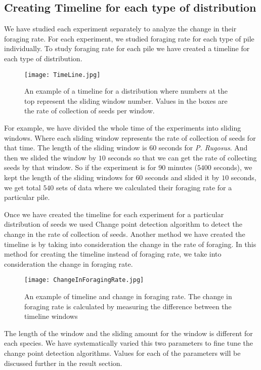  \subsection{\label{Creating Timeline for each type of distribution}Creating Timeline for each type of distribution}
 We have studied each experiment separately to analyze the change in their foraging rate. For each experiment, we studied foraging rate for each type of pile individually. To study foraging rate for each pile we have created a timeline for each type of distribution. \par
 \begin{figure}[h]
 	\texttt{[image: TimeLine.jpg]}
 	\caption{An example of a timeline for a distribution where numbers at the top represent the sliding window number. Values in the boxes are the rate of collection of seeds per window.}
 \end{figure}
 For example, we have divided the whole time of the experiments into sliding windows. Where each sliding window represents the rate of collection of seeds for that time. The length of the sliding window is $60$ seconds for \textit{P. Rugosus}. And then we slided the window by $10$ seconds so that we can get the rate of collecting seeds by that window. So if the experiment is for $90$ minutes ($5400$ seconds), we kept the length of the sliding windows for $60$ seconds and slided it by $10$ seconds, we get total $540$ sets of data where we calculated their foraging rate for a particular pile.\par 
 Once we have created the timeline for each experiment for a particular distribution of seeds we used Change point detection algorithm to detect the change in the rate of collection of seeds. Another method we have created the timeline is by taking into consideration the change in the rate of foraging. In this method for creating the timeline instead of foraging rate, we take into consideration the change in foraging rate.\par
 \begin{figure}[h]
 	\texttt{[image: ChangeInForagingRate.jpg]}
 	\caption{An example of timeline and change in foraging rate. The change in foraging rate is calculated by measuring the difference between the timeline windows}
 \end{figure}
 The length of the window and the sliding amount for the window is different for each species. We have systematically varied this two parameters to fine tune the change point detection algorithms. Values for each of the parameters will be discussed further in the result section. 
